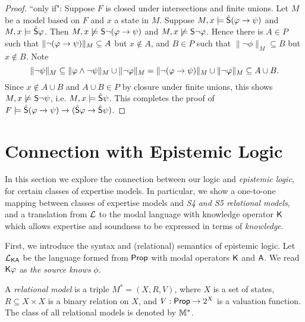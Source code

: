 \begin{proposition}
\begin{proof}
    ``only if": Suppose $F$ is closed under intersections and finite
    unions. Let $M$ be a model based on $F$ and $x$ a state
    in $M$. Suppose $M, x \models \hat\S(\phi \limplies \psi)$
    and $M, x \models \hat\S\phi$. Then $M, x \not\models
    \S\neg(\phi \limplies \psi)$ and $M, x \not\models \S\neg\phi$.
    Hence there is $A \in P$ such that $\|\neg(\phi \limplies
    \psi)\|_M \subseteq A$ but $x \notin A$, and $B \in P$ such
    that $\|\neg\phi\|_M \subseteq B$ but $x \notin B$. Note
    \[
        \|\neg\psi\|_M
        \subseteq \|\phi \land \neg\psi\|_M \cup \|\neg\phi\|_M
        = \|\neg(\phi \limplies \psi)\|_M \cup \|\neg\phi\|_M
        \subseteq A \cup B.
    \]
    Since $x \notin A \cup B$ and $A \cup B \in P$ by closure
    under finite unions, this shows $M, x \not\models \S\neg\psi$, i.e.
    $M, x \models \hat\S\psi$. This completes the proof of $F
    \models \hat{\S}(\phi \limplies \psi) \limplies (\hat{\S}\phi \limplies
    \hat{\S}\psi)$.
\end{proof}
\end{proposition}

\section{Connection with Epistemic Logic}
\label{exp_sec_connection_with_ep_logic}

In this section we explore the connection between our logic and \emph{epistemic
logic}, for certain classes of expertise models. In particular, we show a
one-to-one mapping between classes of expertise models and \emph{S4 and S5
relational models}, and a translation from $\cL$ to the modal language with
knowledge operator $\K$ which allows expertise and soundness to be expressed in
terms of \emph{knowledge}.

First, we introduce the syntax and (relational) semantics of epistemic logic.
Let $\cLKA$ be the language formed from $\Prop$ with modal operators $\K$ and
$\A$. We read $\K\phi$ as \emph{the source knows} $\phi$.

\begin{definition}
\label{exp_def_relational_models}

    A \emph{relational model} is a triple $M^* = (X, R, V)$, where $X$ is a set
    of states, $R \subseteq X \times X$ is a binary relation on $X$, and $V:
    \Prop \to 2^X$ is a valuation function. The class of all relational models
    is denoted by $\Mrel$.

\end{definition}

